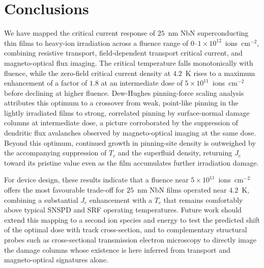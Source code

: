 \section{Conclusions}
\label{sec:conclusion}

We have mapped the critical current response of $25$~nm NbN superconducting thin films to heavy-ion irradiation across a fluence range of $0$--$1\times10^{12}$~ions~cm$^{-2}$, combining resistive transport, field-dependent transport critical current, and magneto-optical flux imaging. The critical temperature falls monotonically with fluence, while the zero-field critical current density at $4.2$~K rises to a maximum enhancement of a factor of $1.8$ at an intermediate dose of $5\times10^{11}$~ions~cm$^{-2}$ before declining at higher fluence. Dew-Hughes pinning-force scaling analysis attributes this optimum to a crossover from weak, point-like pinning in the lightly irradiated films to strong, correlated pinning by surface-normal damage columns at intermediate dose, a picture corroborated by the suppression of dendritic flux avalanches observed by magneto-optical imaging at the same dose. Beyond this optimum, continued growth in pinning-site density is outweighed by the accompanying suppression of $T_c$ and the superfluid density, returning $J_c$ toward its pristine value even as the film accumulates further irradiation damage.

For device design, these results indicate that a fluence near $5\times10^{11}$~ions~cm$^{-2}$ offers the most favourable trade-off for $25$~nm NbN films operated near $4.2$~K, combining a substantial $J_c$ enhancement with a $T_c$ that remains comfortably above typical SNSPD and SRF operating temperatures. Future work should extend this mapping to a second ion species and energy to test the predicted shift of the optimal dose with track cross-section, and to complementary structural probes such as cross-sectional transmission electron microscopy to directly image the damage columns whose existence is here inferred from transport and magneto-optical signatures alone.
